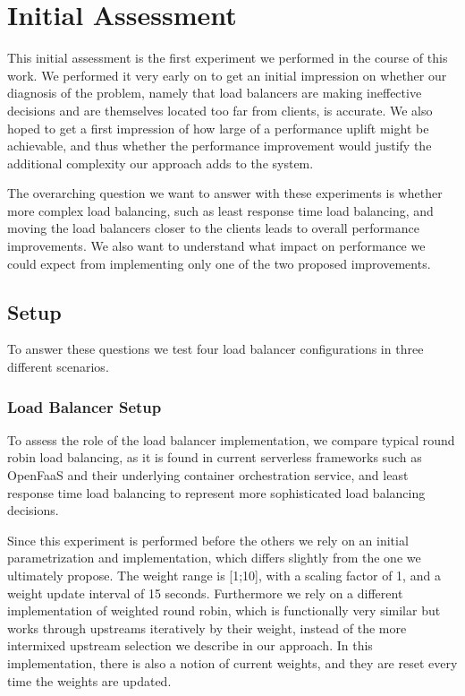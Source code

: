 \section{Initial Assessment}
This initial assessment is the first experiment we performed in the course of this work.
We performed it very early on to get an initial impression on whether our diagnosis of the problem, namely that load balancers are making ineffective decisions and are themselves located too far from clients, is accurate.
We also hoped to get a first impression of how large of a performance uplift might be achievable, and thus whether the performance improvement would justify the additional complexity our approach adds to the system.

The overarching question we want to answer with these experiments is whether more complex load balancing, such as least response time load balancing, and moving the load balancers closer to the clients leads to overall performance improvements.
We also want to understand what impact on performance we could expect from implementing only one of the two proposed improvements.

\subsection{Setup}
To answer these questions we test four load balancer configurations in three different scenarios.
\subsubsection{Load Balancer Setup}
To assess the role of the load balancer implementation, we compare typical round robin load balancing, as it is found in current serverless frameworks such as OpenFaaS\cite{openfaas} and their underlying container orchestration service\cite{kubernetes}, and least response time load balancing to represent more sophisticated load balancing decisions.

Since this experiment is performed before the others we rely on an initial parametrization and implementation, which differs slightly from the one we ultimately propose.
The weight range is [1;10], with a scaling factor of 1, and a weight update interval of 15 seconds.
Furthermore we rely on a different implementation of weighted round robin\cite{wrr-kblinux}, which is functionally very similar but works through upstreams iteratively by their weight, instead of the more intermixed upstream selection we describe in our approach.
In this implementation, there is also a notion of current weights\cite{wrr-kblinux}, and they are reset every time the weights are updated.

